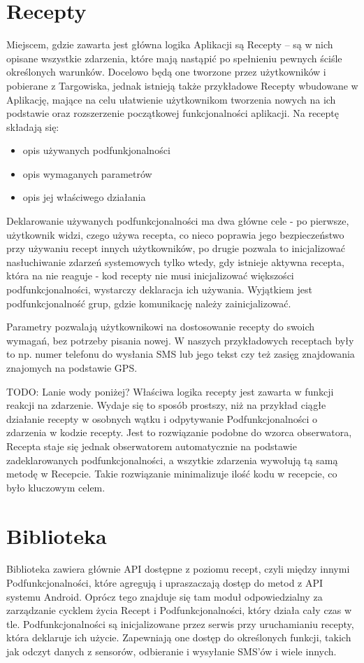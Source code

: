 \documentclass[11pt,a4paper,polish,thesis]{dcsbook}
\begin{document}
\section{Recepty}               %
Miejscem, gdzie zawarta jest główna logika Aplikacji są Recepty -- są w nich opisane wszystkie zdarzenia, które mają nastąpić po spełnieniu pewnych ściśle określonych warunków. Docelowo będą one tworzone przez użytkowników i pobierane z Targowiska, jednak istnieją także przykładowe Recepty wbudowane w Aplikację, mające na celu ułatwienie użytkownikom tworzenia nowych na ich podstawie oraz rozszerzenie początkowej funkcjonalności aplikacji. 
Na receptę składają się:
\begin{itemize}
\item  opis używanych podfunkjonalności
\item  opis wymaganych parametrów
\item  opis jej właściwego działania
\end{itemize}
Deklarowanie używanych podfunkcjonalności ma dwa główne cele - po pierwsze, użytkownik widzi, czego używa recepta, co nieco poprawia jego bezpieczeństwo przy używaniu recept innych użytkowników, po drugie pozwala to inicjalizować nasłuchiwanie zdarzeń systemowych tylko wtedy, gdy istnieje aktywna recepta, która na nie reaguje - kod recepty nie musi inicjalizować większości podfunkcjonalności, wystarczy deklaracja ich używania. Wyjątkiem jest podfunkcjonalność grup, gdzie komunikację należy zainicjalizować.

Parametry pozwalają użytkownikowi na dostosowanie recepty do swoich wymagań, bez potrzeby pisania nowej. W naszych przykładowych receptach były to np. numer telefonu do wysłania SMS lub jego tekst czy też zasięg znajdowania znajomych na podstawie GPS.


TODO: Lanie wody poniżej?
Właściwa logika recepty jest zawarta w funkcji reakcji na zdarzenie. Wydaje się to sposób prostszy, niż na przykład ciągłe działanie recepty w osobnych wątku i odpytywanie Podfunkcjonalności o zdarzenia w kodzie recepty. Jest to rozwiązanie podobne do wzorca obserwatora, Recepta staje się jednak obserwatorem automatycznie na podstawie zadeklarowanych podfunkcjonalności, a wszytkie zdarzenia wywołują tą samą metodę w Recepcie. Takie rozwiązanie minimalizuje ilość kodu w recepcie, co było kluczowym celem.

\section{Biblioteka}
Biblioteka zawiera głównie API dostępne z poziomu recept, czyli między innymi Podfunkcjonalności, które agregują i upraszaczają dostęp do metod z API systemu Android. Oprócz tego znajduje się tam moduł odpowiedzialny za zarządzanie cycklem życia Recept i Podfunkcjonalności, który działa cały czas w tle. Podfunkcjonalności są inicjalizowane przez serwis przy uruchamianiu recepty, która deklaruje ich użycie. Zapewniają one dostęp do określonych funkcji, takich jak odczyt danych z sensorów, odbieranie i wysyłanie SMS'ów i wiele innych.
\end{document}
